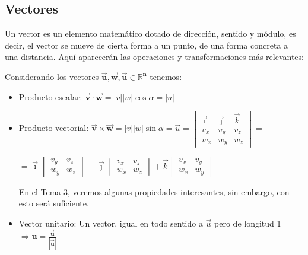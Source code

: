 \subsection{Vectores}
 Un vector es un elemento matemático dotado de dirección, sentido y módulo, es decir, el vector se mueve de cierta forma a un punto, de una forma concreta a una distancia.
Aquí aparecerán las operaciones y transformaciones más relevantes:


\vspace{0.5cm}
Considerando los vectores \(\bm{\vec{u},\vec{w}, \vec{u} \in \mathbb{R}^n}\) tenemos:


\vspace{0.3cm}
\begin{itemize}
        \item Producto escalar: \( \bm{\vec{v}\cdot \vec{w}} = \left\lvert v\right\rvert \left\lvert w\right\rvert \cos{\alpha } = \left\lvert u\right\rvert \)


        \item Producto vectorial: \(\bm{\vec{v}\times \vec{w}} = \left\lvert v\right\rvert \left\lvert w\right\rvert \sin{\alpha } = \vec{u} = \begin{vmatrix}
                      \vec{\imath} & \vec{\jmath} & \vec{k} \\
                      v_x          & v_y          & v_z     \\
                      w_x          & w_y          & w_z
              \end{vmatrix} =\) \par \hspace{1.5cm} \( = \vec{\imath}
              \begin{vmatrix}
                      v_y & v_z \\
                      w_y & w_z
              \end{vmatrix}
              -\vec{\jmath} \begin{vmatrix}
                      v_x & v_z \\
                      w_x & w_z
              \end{vmatrix}
              + \vec{k} \begin{vmatrix}
                      v_x & v_y \\
                      w_x & w_y
              \end{vmatrix}
              \) \par
              En el Tema 3, veremos algunas propiedades interesantes, sin embargo, con esto será suficiente.
        \item Vector unitario: Un vector, igual en todo sentido a \(\vec{u}\) pero de longitud 1 \(\Rightarrow  \bm{\hat{u} = \frac{\vec{u}}{\left | \vec{u} \right |}}\)
\end{itemize}
